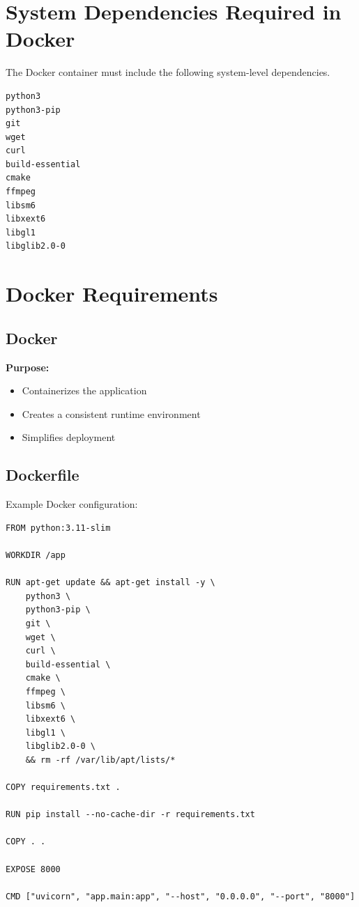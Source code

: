 \documentclass[12pt]{article}
\begin{document}
\section{System Dependencies Required in Docker}

The Docker container must include the following system-level dependencies.

\begin{verbatim}
python3
python3-pip
git
wget
curl
build-essential
cmake
ffmpeg
libsm6
libxext6
libgl1
libglib2.0-0
\end{verbatim}

\section{Docker Requirements}

\subsection{Docker}

\textbf{Purpose:}
\begin{itemize}
    \item Containerizes the application
    \item Creates a consistent runtime environment
    \item Simplifies deployment
\end{itemize}

\subsection{Dockerfile}

Example Docker configuration:

\begin{verbatim}
FROM python:3.11-slim

WORKDIR /app

RUN apt-get update && apt-get install -y \
    python3 \
    python3-pip \
    git \
    wget \
    curl \
    build-essential \
    cmake \
    ffmpeg \
    libsm6 \
    libxext6 \
    libgl1 \
    libglib2.0-0 \
    && rm -rf /var/lib/apt/lists/*

COPY requirements.txt .

RUN pip install --no-cache-dir -r requirements.txt

COPY . .

EXPOSE 8000

CMD ["uvicorn", "app.main:app", "--host", "0.0.0.0", "--port", "8000"]
\end{verbatim}
\end{document}
